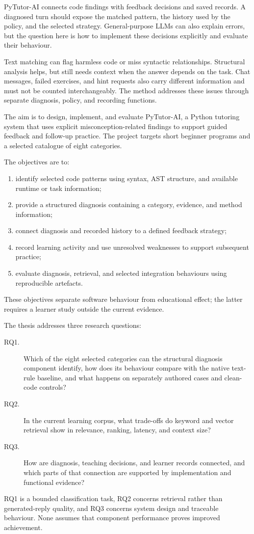 PyTutor-AI connects code findings with feedback decisions and saved records. A diagnosed turn should expose the matched pattern, the history used by the policy, and the selected strategy. General-purpose LLMs can also explain errors, but the question here is how to implement these decisions explicitly and evaluate their behaviour.

Text matching can flag harmless code or miss syntactic relationships. Structural analysis helps, but still needs context when the answer depends on the task. Chat messages, failed exercises, and hint requests also carry different information and must not be counted interchangeably. The method addresses these issues through separate diagnosis, policy, and recording functions.

The aim is to design, implement, and evaluate PyTutor-AI, a Python tutoring system that uses explicit misconception-related findings to support guided feedback and follow-up practice. The project targets short beginner programs and a selected catalogue of eight categories.

The objectives are to:
\begin{enumerate}
\item identify selected code patterns using syntax, AST structure, and available runtime or task information;
\item provide a structured diagnosis containing a category, evidence, and method information;
\item connect diagnosis and recorded history to a defined feedback strategy;
\item record learning activity and use unresolved weaknesses to support subsequent practice;
\item evaluate diagnosis, retrieval, and selected integration behaviours using reproducible artefacts.
\end{enumerate}
These objectives separate software behaviour from educational effect; the latter requires a learner study outside the current evidence.

The thesis addresses three research questions:
\begin{description}
\item[RQ1.] Which of the eight selected categories can the structural diagnosis component identify, how does its behaviour compare with the native text-rule baseline, and what happens on separately authored cases and clean-code controls?
\item[RQ2.] In the current learning corpus, what trade-offs do keyword and vector retrieval show in relevance, ranking, latency, and context size?
\item[RQ3.] How are diagnosis, teaching decisions, and learner records connected, and which parts of that connection are supported by implementation and functional evidence?
\end{description}
RQ1 is a bounded classification task, RQ2 concerns retrieval rather than generated-reply quality, and RQ3 concerns system design and traceable behaviour. None assumes that component performance proves improved achievement.

